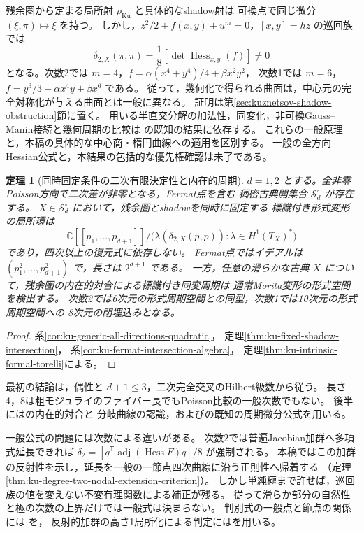 \documentclass[a4paper,11pt]{ltjsarticle}
\numberwithin{equation}{section}
\theoremstyle{plain}
\newtheorem{theorem}{定理}[section]
\theoremstyle{definition}
\theoremstyle{remark}
\newcommand{\C}{\mathbb C}
\begin{document}
残余圏から定まる局所射 $\rho_{\mathrm{Ku}}$ と具体的なshadow射は
可換点で同じ微分 $(\xi,\pi)\mapsto\xi$ を持つ。
しかし，$z^2/2+f(x,y)+u^m=0$，$[x,y]=hz$ の巡回族では
\[
 \delta_{2,X}(\pi,\pi)=\frac18[\det\operatorname{Hess}_{x,y}(f)]\ne0
\]
となる。次数2では $m=4$，$f=\alpha(x^4+y^4)/4+\beta x^2y^2$，
次数1では $m=6$，$f=y^3/3+\alpha x^4y+\beta x^6$ である。
従って，幾何化で得られる曲面は，中心元の完全対称化が与える曲面とは一般に異なる。
証明は第\ref{sec:kuznetsov-shadow-obstruction}節に置く。
用いる半直交分解の加法性，同変化，非可換Gauss--Manin接続と幾何周期の比較は
\cite{KellerDG2006,Elagin2015,Sheridan2020,Tu2024}の既知の結果に依存する。
これらの一般原理と，本稿の具体的な中心商・楕円曲線への適用を区別する。
一般の全方向Hessian公式と，本結果の包括的な優先権確認は未了である。

\begin{theorem}[同時固定条件の二次有限決定性と内在的周期]
\label{thm:main-ku-finite-determinacy-period}
$d=1,2$ とする。全非零Poisson方向で二次差が非零となる，Fermat点を含む
稠密古典開集合 $\mathcal S_d^\circ$ が存在する。
$X\in\mathcal S_d^\circ$ において，残余圏とshadowを同時に固定する
標識付き形式変形の局所環は
\[
 \C[[p_1,\ldots,p_{d+1}]]/
  \bigl(\lambda(\delta_{2,X}(p,p)):\lambda\in H^1(T_X)^*\bigr)
\]
であり，四次以上の復元式に依存しない。
Fermat点ではイデアルは $(p_1^2,\ldots,p_{d+1}^2)$ で，長さは $2^{d+1}$ である。
一方，任意の滑らかな古典 $X$ について，残余圏の内在的対合による標識付き同変周期は
通常Morita変形の形式空間を検出する。
次数2では6次元の形式周期空間との同型，次数1では10次元の形式周期空間への
8次元の閉埋込みとなる。
\end{theorem}
\begin{proof}
系\ref{cor:ku-generic-all-directions-quadratic}，
定理\ref{thm:ku-fixed-shadow-intersection}，
系\ref{cor:ku-fermat-intersection-algebra}，
定理\ref{thm:ku-intrinsic-formal-torelli}による。
\end{proof}
最初の結論は，偶性と $d+1\le3$，二次完全交叉のHilbert級数から従う。
長さ4，8は粗モジュライのファイバー長でもPoisson比較の一般次数でもない。
後半には\cite[Proposition~4.1, Theorem~4.2]{LinRampazzoZhang2026}の内在的対合と
分岐曲線の認識，および\cite[Theorem~4.3]{Landesman2019Torelli}の既知の周期微分公式を用いる。

一般公式の問題には次数による違いがある。
次数2では普遍Jacobian加群へ多項式延長できれば
$\delta_2=[q^{\mathsf T}\operatorname{adj}(\operatorname{Hess}F)q]/8$ が強制される。
本稿ではこの加群の反射性を示し，延長を一般の一節点四次曲線に沿う正則性へ帰着する
（定理\ref{thm:ku-degree-two-nodal-extension-criterion}）。
しかし単純極まで許せば，巡回族の値を変えない不変有理関数による補正が残る。
従って滑らか部分の自然性と極の次数の上界だけでは一般式は決まらない。
判別式の一般点と節点の関係には
\cite[\S2, Propositions~5.1--5.2, Theorem~1.1]{PoonenStoll2025}を，
反射的加群の高さ1局所化による判定には\cite[Tag~0AVB]{StacksProject}を用いる。
\end{document}
